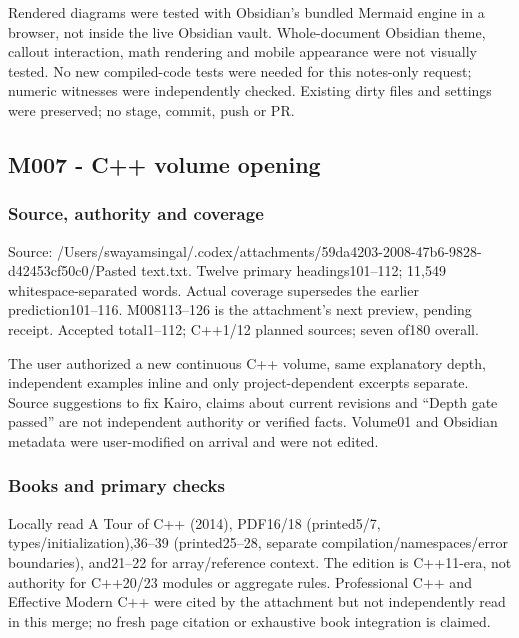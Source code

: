 Rendered diagrams were tested with Obsidian's bundled Mermaid engine in a browser, not inside the live Obsidian vault. Whole-document Obsidian theme, callout interaction, math rendering and mobile appearance were not visually tested. No new compiled-code tests were needed for this notes-only request; numeric witnesses were independently checked. Existing dirty files and settings were preserved; no stage, commit, push or PR.

\subsection{M007 - C++ volume opening}\label{appendix-a103e7846d21-m007---c-volume-opening}

\subsubsection{Source, authority and coverage}\label{appendix-a103e7846d21-source-authority-and-coverage}

Source: /Users/swayamsingal/.codex/attachments/59da4203-2008-47b6-9828-d42453cf50c0/Pasted text.txt. Twelve primary headings101--112; 11,549 whitespace-separated words. Actual coverage supersedes the earlier prediction101--116. M008113--126 is the attachment's next preview, pending receipt. Accepted total1--112; C++1/12 planned sources; seven of180 overall.

The user authorized a new continuous C++ volume, same explanatory depth, independent examples inline and only project-dependent excerpts separate. Source suggestions to fix Kairo, claims about current revisions and ``Depth gate passed'' are not independent authority or verified facts. Volume01 and Obsidian metadata were user-modified on arrival and were not edited.

\subsubsection{Books and primary checks}\label{appendix-a103e7846d21-books-and-primary-checks}

Locally read A Tour of C++ (2014), PDF16/18 (printed5/7, types/initialization),36--39 (printed25--28, separate compilation/namespaces/error boundaries), and21--22 for array/reference context. The edition is C++11-era, not authority for C++20/23 modules or aggregate rules. Professional C++ and Effective Modern C++ were cited by the attachment but not independently read in this merge; no fresh page citation or exhaustive book integration is claimed.

